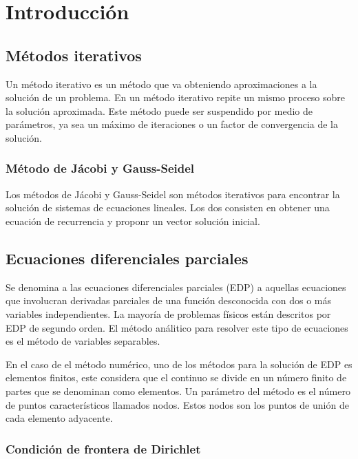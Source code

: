 \section{Introducción}

\subsection{Métodos iterativos}

Un método iterativo es un método que va obteniendo aproximaciones a la solución de un problema. En un método iterativo repite un mismo proceso sobre la solución aproximada. Este método puede ser suspendido por medio de parámetros, ya sea un máximo de iteraciones o un factor de convergencia de la solución.

\subsubsection{Método de Jácobi y Gauss-Seidel}

Los métodos de Jácobi y Gauss-Seidel son métodos iterativos para encontrar la solución de sistemas de ecuaciones lineales. Los dos consisten en obtener una ecuación de recurrencia y proponr un vector solución inicial.

\subsection{Ecuaciones diferenciales parciales}

Se denomina a las ecuaciones diferenciales parciales (EDP) a aquellas ecuaciones que involucran derivadas parciales de una función desconocida con dos o más variables independientes. La mayoría de problemas físicos están descritos por EDP de segundo orden. El método análitico para resolver este tipo de ecuaciones es el método de variables separables.

En el caso de el método numérico, uno de los métodos para la solución de EDP es elementos finitos, este considera que el continuo se divide en un número finito de partes que se denominan como elementos. Un parámetro del método es el número de puntos característicos llamados nodos. Estos nodos son los puntos de unión de cada elemento adyacente\cite{Acosto_2016}.

\subsubsection{Condición de frontera de Dirichlet}


